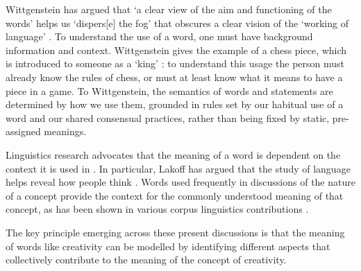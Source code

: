 \documentclass[10pt,letterpaper]{article}
\begin{document}
Wittgenstein \cite{wittgenstein58} has argued that `a clear view of the aim and functioning of the words' helps us `dispers[e] the fog' that obscures a clear vision of the `working of language' \cite[Part 1, Paragraph 5]{wittgenstein58}. To understand the use of a word, one must have background information and context. Wittgenstein gives the example of a chess piece, which is introduced to someone as a `king' \cite[paragraph 31]{wittgenstein58}: to understand this usage the person must already know the rules of chess, or must at least know what it means to have a piece in a game. To Wittgenstein, the semantics of words and statements are determined by how we use them, grounded in rules set by our habitual use of a word and our shared consensual practices, rather than being fixed by static, pre-assigned meanings.        


Linguistics research advocates that the meaning of a word is dependent on the context it is used in \cite{firth57}. In particular, Lakoff has argued that the study of language helps reveal how people think \cite{lakoff87,lakoff80}. Words used frequently in discussions of the nature of a concept provide the context for the commonly understood meaning of that concept, as has been shown in various corpus linguistics contributions \cite{oakes98,rayson00,kilgarriff01,kilgarriff06}. 

The key principle emerging across these present discussions is that the meaning of words like creativity can be modelled by identifying different aspects that collectively contribute to the meaning of the concept of creativity. 

\end{document}
